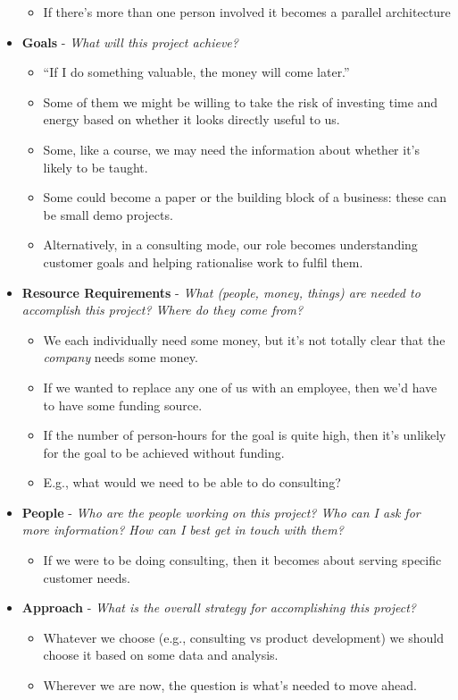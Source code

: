 \documentclass[11pt]{article}
\begin{document}
\begin{itemize}
\begin{itemize}
\item If there’s more than one person involved it becomes a parallel architecture
\end{itemize}
\item \textbf{Goals} - \emph{What will this project achieve?}
\begin{itemize}
\item “If I do something valuable, the money will come later.”
\item Some of them we might be willing to take the risk of investing time and energy based on whether it looks directly useful to us.
\item Some, like a course, we may need the information about whether it’s likely to be taught.
\item Some could become a paper or the building block of a business: these can be small demo projects.
\item Alternatively, in a consulting mode, our role becomes understanding customer goals and helping rationalise work to fulfil them.
\end{itemize}
\item \textbf{Resource Requirements} - \emph{What (people, money, things) are needed to accomplish this project?  Where do they come from?}
\begin{itemize}
\item We each individually need some money, but it’s not totally clear that the \emph{company} needs some money.
\item If we wanted to replace any one of us with an employee, then we’d have to have some funding source.
\item If the number of person-hours for the goal is quite high, then it’s unlikely for the goal to be achieved without funding.
\item E.g., what would we need to be able to do consulting?
\end{itemize}
\item \textbf{People} - \emph{Who are the people working on this project? Who can I ask for more information? How can I best get in touch with them?}
\begin{itemize}
\item If we were to be doing consulting, then it becomes about serving specific customer needs.
\end{itemize}
\item \textbf{Approach} - \emph{What is the overall strategy for accomplishing this project?}
\begin{itemize}
\item Whatever we choose (e.g., consulting vs product development) we should choose it based on some data and analysis.
\item Wherever we are now, the question is what’s needed to move ahead.
\end{itemize}


\end{itemize}
\end{document}
